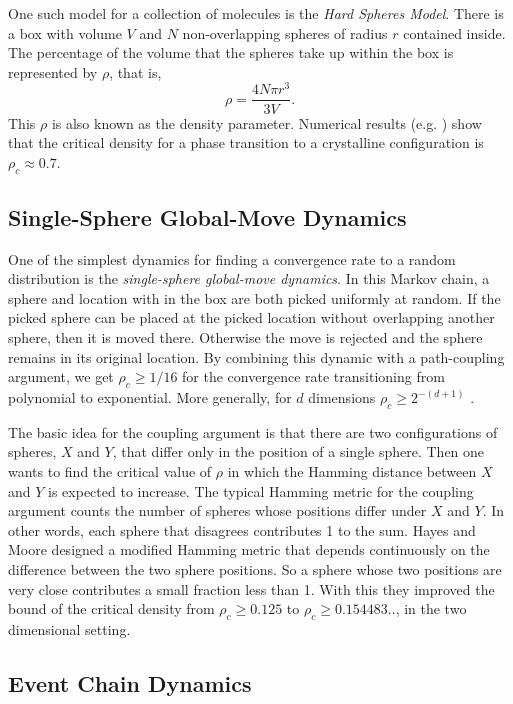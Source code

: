 \documentclass[a4paper,11pt]{article}
\begin{document}
One such model for a collection of molecules is the \textit{Hard Spheres Model}.  There is a box with volume $V$ and $N$ non-overlapping spheres of radius $r$ contained inside.  The percentage of the volume that the spheres take up within the box is represented by $\rho$, that is,
\begin{displaymath}
  \rho = \frac{4N\pi r^3}{3V}.
\end{displaymath}
This $\rho$ is also known as the density parameter. Numerical results (e.g. \cite{Mak}\cite{Piasecki}) show that the critical density for a phase transition to a crystalline configuration is $\rho_c \approx 0.7$.

\subsection*{Single-Sphere Global-Move Dynamics}

One of the simplest dynamics for finding a convergence rate to a random distribution is the \textit{single-sphere global-move dynamics}.  In this Markov chain, a sphere and location with in the box are both picked uniformly at random.  If the picked sphere can be placed at the picked location without overlapping another sphere, then it is moved there.  Otherwise the move is rejected and the sphere remains in its original location.  By combining this dynamic with a path-coupling argument, we get $\rho_c \ge 1/16$ for the convergence rate transitioning from polynomial to exponential.  More generally, for $d$ dimensions $\rho_c \ge 2^{-(d + 1)}$ \cite{Kannan}.

The basic idea for the coupling argument is that there are two configurations of spheres, $X$ and $Y$, that differ only in the position of a single sphere.  Then one wants to find the critical value of $\rho$ in which the Hamming distance between $X$ and $Y$ is expected to increase.  The typical Hamming metric for the coupling argument counts the number of spheres whose positions differ under $X$ and $Y$.  In other words, each sphere that disagrees contributes 1 to the sum.  Hayes and Moore \cite{Hayes} designed a modified Hamming metric that depends continuously on the difference between the two sphere positions.  So a sphere whose two positions are very close contributes a small fraction less than 1.  With this they improved the bound of the critical density from $\rho_c \ge 0.125$ to $\rho_c \ge 0.154483..$, in the two dimensional setting.

\subsection*{Event Chain Dynamics}
\end{document}

